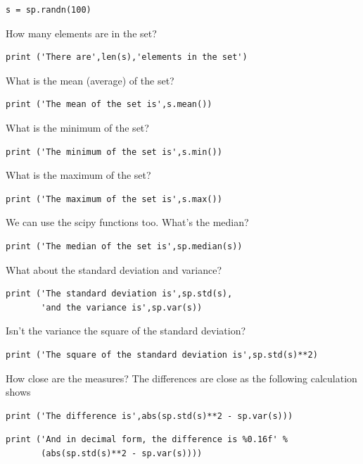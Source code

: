\begin{verbatim}
s = sp.randn(100)
\end{verbatim}

How many elements are in the set?

\begin{verbatim}
print ('There are',len(s),'elements in the set')
\end{verbatim}

What is the mean (average) of the set?

\begin{verbatim}
print ('The mean of the set is',s.mean())
\end{verbatim}

What is the minimum of the set?

\begin{verbatim}
print ('The minimum of the set is',s.min())
\end{verbatim}

What is the maximum of the set?

\begin{verbatim}
print ('The maximum of the set is',s.max())
\end{verbatim}

We can use the scipy functions too. What's the median?

\begin{verbatim}
print ('The median of the set is',sp.median(s))
\end{verbatim}

What about the standard deviation and variance?

\begin{verbatim}
print ('The standard deviation is',sp.std(s),
       'and the variance is',sp.var(s))
\end{verbatim}

Isn't the variance the square of the standard deviation?

\begin{verbatim}
print ('The square of the standard deviation is',sp.std(s)**2)
\end{verbatim}

How close are the measures? The differences are close as the following
calculation shows

\begin{verbatim}
print ('The difference is',abs(sp.std(s)**2 - sp.var(s)))
\end{verbatim}

\begin{verbatim}
print ('And in decimal form, the difference is %0.16f' % 
       (abs(sp.std(s)**2 - sp.var(s))))
\end{verbatim}

